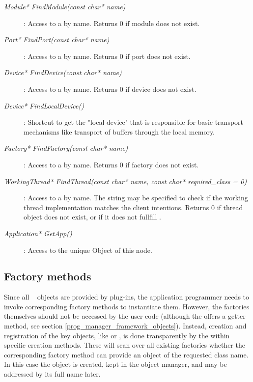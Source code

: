 \begin{description}

\item[\em Module* FindModule\small (const char* name)] :
Access to a  by name. Returns $0$ if module does not exist.
   
\item[\em Port* FindPort\small (const char* name)]:
Access to a  by name. Returns $0$ if port does not exist.
 
\item[\em Device* FindDevice\small (const char* name)] :
Access to a  by name. Returns $0$ if device does not exist.

\item[\em Device* FindLocalDevice()] :
Shortcut to get the "local device" that is responsible for basic transport
mechanisms like transport of buffers through the local memory.
         
\item[\em Factory* FindFactory\small (const char* name)] :
Access to a  by name. Returns $0$ if factory does not exist.


\item[\em WorkingThread* FindThread\small (const char* name, const char* required\_class = 0)] :
Access to a  by name. The  string may
be specified to check if the working thread implementation matches the client
intentions. Returns $0$ if thread object does not exist, or if it does not fullfill
.


\item[\em Application* GetApp()] : 
Access to the unique  Object of this node.


	 
\end{description}

\subsection{Factory methods}	 
Since all \dabc~ objects are provided by   plug-ins,
the application programmer needs to invoke corresponding factory methods to
instantiate them. However, the factories themselves should not be accessed by the
user code (although the  offers a getter method, see section
\ref{prog_manager_framework_objects}). Instead, creation and registration
of the key objects, like  or , 
is done transparently by the  
within specific creation methods. These will scan over all existing factories 
whether the corresponding factory method can provide an object of the requested class name.
In this case the object is created, kept in the object manager, and may be
addressed by its full name later.



